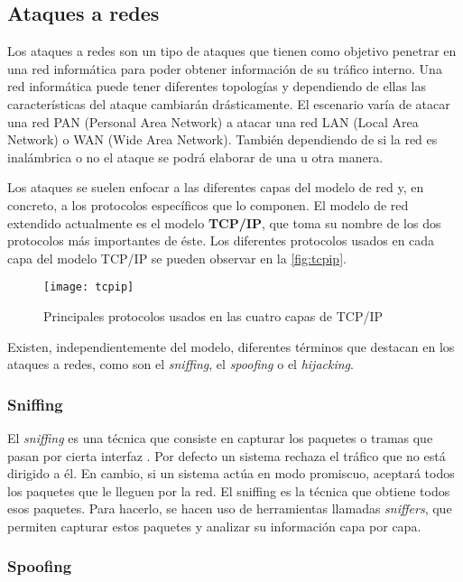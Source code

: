 \subsection{Ataques a redes}

Los ataques a redes son un tipo de ataques que tienen como objetivo penetrar en una red informática para poder obtener información de su tráfico interno. Una red informática puede tener diferentes topologías y dependiendo de ellas las características del ataque cambiarán drásticamente. El escenario varía de atacar una red PAN (Personal Area Network) a atacar una red LAN (Local Area Network) o WAN (Wide Area Network). También dependiendo de si la red es inalámbrica o no el ataque se podrá elaborar de una u otra manera.

Los ataques se suelen enfocar a las diferentes capas del modelo de red y, en concreto, a los protocolos específicos que lo componen. El modelo de red extendido actualmente es el modelo \textbf{TCP/IP}, que toma su nombre de los dos protocolos más importantes de éste. Los diferentes protocolos usados en cada capa del modelo TCP/IP se pueden observar en la \autoref{fig:tcpip}.

\begin{figure}[H]
	\centering
	\texttt{[image: tcpip]}
	\caption{Principales protocolos usados en las cuatro capas de TCP/IP}
	\label{fig:tcpip}
\end{figure}

Existen, independientemente del modelo, diferentes términos que destacan en los ataques a redes, como son el \textit{sniffing}, el \textit{spoofing} o el \textit{hijacking}.

\subsubsection{Sniffing}

El \emph{sniffing} es una técnica que consiste en capturar los paquetes o tramas que pasan por cierta interfaz \cite{ataque-en-redes-ip}. Por defecto un sistema rechaza el tráfico que no está dirigido a él. En cambio, si un sistema actúa en modo promiscuo, aceptará todos los paquetes que le lleguen por la red. El sniffing es la técnica que obtiene todos esos paquetes. Para hacerlo, se hacen uso de herramientas llamadas \textit{sniffers}, que permiten capturar estos paquetes y analizar su información capa por capa.

\subsubsection{Spoofing}

